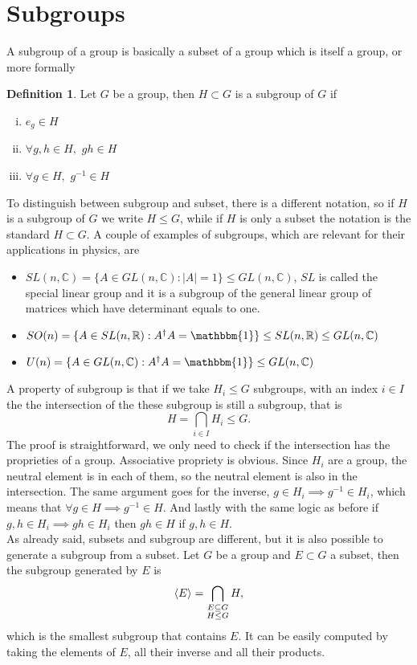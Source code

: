\documentclass[12pt]{book}
\theoremstyle{plain}
\newcommand{\R}{\mathbb{R}}
\newcommand{\I}{\mathbbm{1}}
\newcommand{\C}{\mathbb{C}}
\renewcommand{\H}{\mathcal{H}}
\theoremstyle{definition}
\newtheorem{dfn}[thm]{Definition}
\theoremstyle{remark}
\begin{document}
\section{Subgroups}
A subgroup of a group is basically a subset of a group which is itself a group, or more formally
\begin{dfn}
Let $G$ be a group, then $H\subset G$ is a subgroup of $G$ if
\begin{enumerate}[i.]
	\item $e_g \in H$
	\item $\forall g,h \in H,$ $gh\in H$
	\item $\forall g\in H,$ $g^{-1}\in H$
\end{enumerate}
\end{dfn}
To distinguish between subgroup and subset, there is a different notation, so if $H$ is a subgroup of $G$ we write $H\leq G$, while if $H$ is only a subset the notation is the standard $H\subset G$. A couple of examples of subgroups, which are relevant for their applications in physics, are
\begin{itemize}
\item $SL(n,\C) = \{A\in GL(n,\C): |A| = 1\}\leq GL(n,\C)$, $SL$ is called the special linear group and it is a subgroup of the general linear group of matrices which have determinant equals to one.
\item $SO(n) = \{A\in SL(n,\R) : A^\dagger A = \I\}\leq SL(n,\R)\leq GL(n,\C)$ 
\item $U(n) = \{A\in GL(n,\C):A^\dagger A= \I \} \leq GL(n,\C)$
\end{itemize}
A property of subgroup is that if we take $H_i\leq G$ subgroups, with an index $i\in I$ the the intersection of the these subgroup is still a subgroup, that is
\[H = \bigcap_{i\in I} H_i \leq G.\]
The proof is straightforward, we only need to check if the intersection has the proprieties of a group. Associative propriety is obvious. Since $H_i$ are a group, the neutral element is in each of them, so the neutral element is also in the intersection. The same argument goes for the inverse, $g\in H_i \implies g^{-1}\in H_i$, which means that $\forall g\in H \implies g^{-1}\in H$. And lastly with the same logic as before if $g,h\in H_i\implies gh \in H_i$ then $gh\in H$ if $g,h\in H$.\\
As already said, subsets and subgroup are different, but it is also possible to generate a subgroup from a subset. Let $G$ be a group and $E\subset G$ a subset, then the subgroup generated by $E$ is
\[\braket{E} = \bigcap_{\substack{E\subseteq G\\H\leq G}} H,\]
which is the smallest subgroup that contains $E$. It can be easily computed by taking the elements of $E$, all their inverse and all their products.
\end{document}

